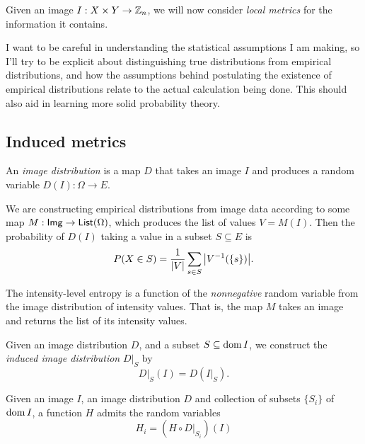 \documentclass[../notebook.tex]{subfiles}
\begin{document}

Given an image $I:X \times Y \to \mathbb{Z}_n$, we will now consider \emph{local
metrics} for the information it contains.

I want to be careful in understanding the statistical assumptions I am making,
so I'll try to be explicit about distinguishing true distributions from
empirical distributions, and how the assumptions behind postulating the
existence of empirical distributions relate to the actual calculation being
done. This should also aid in learning more solid probability theory.

\subsection{Induced metrics}

\begin{defn}
  An \emph{image distribution} is a map $D$ that takes an image $I$ and produces
  a random variable $D(I):\Omega \to E$.

  We are constructing empirical distributions from image data according to some
  map $M:\mathsf{Img} \to \mathsf{List}(\Omega)$, which produces the list of values $V =
  M(I)$. Then the probability of $D(I)$ taking a value in a subset $S \subseteq
  E$ is
  \[
    P(X \in S)
    = \frac{1}{\abs{V}}\sum_{s \in S} \abs{V^{-1}(\{s\})}.
  \]
\end{defn}

\begin{eg}
  The intensity-level entropy is a function of the \emph{nonnegative} random
  variable from the image distribution of intensity values. That is, the map $M$
  takes an image and returns the list of its intensity values.
\end{eg}

\begin{defn}
  Given an image distribution $D$, and a subset $S \subseteq \operatorname{\mathrm{dom}} I$, we
  construct the \emph{induced image distribution} $D|_S$ by
  \begin{equation}
    D|_S(I)
    = D(I|_S).
    \label{eq:inddist}
  \end{equation}
\end{defn}

\begin{defn}
  Given an image $I$, an image distribution $D$ and collection of subsets
  $\{S_i\}$ of $\operatorname{\mathrm{dom}} I$, a function $H$ admits the random variables
  \[
    H_i
    = (H \circ D|_{S_i})(I)
  \]
\end{defn}
\end{document}
